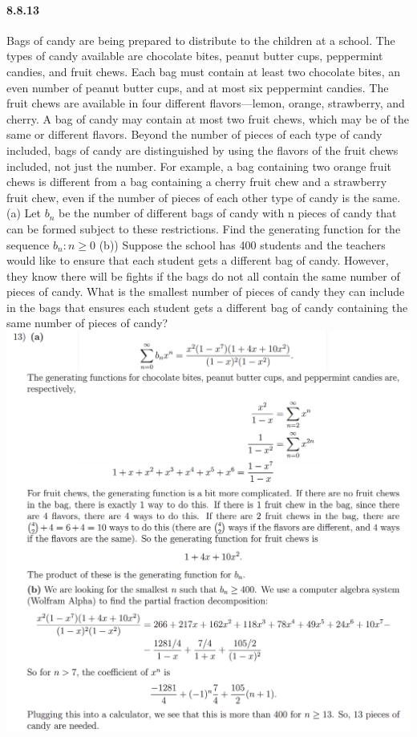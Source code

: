 \documentclass{article}
\begin{document}
\paragraph{8.8.13}
Bags of candy are being prepared to distribute to the children at a school. The
types of candy available are chocolate bites, peanut butter cups, peppermint candies,
and fruit chews. Each bag must contain at least two chocolate bites, an even number of peanut butter cups, and at most six peppermint candies. The fruit chews are available
in four different flavors—lemon, orange, strawberry, and cherry. A bag of candy may
contain at most two fruit chews, which may be of the same or different flavors. Beyond
the number of pieces of each type of candy included, bags of candy are distinguished
by using the flavors of the fruit chews included, not just the number. For example, a
bag containing two orange fruit chews is different from a bag containing a cherry fruit
chew and a strawberry fruit chew, even if the number of pieces of each other type of
candy is the same.\newline
(a) Let $b_n$ be the number of different bags of candy with n pieces of candy that can be
formed subject to these restrictions. Find the generating function for the sequence
${b_n : n \ge 0}$\newline
(b)) Suppose the school has 400 students and the teachers would like to ensure that
each student gets a different bag of candy. However, they know there will be
fights if the bags do not all contain the same number of pieces of candy. What is
the smallest number of pieces of candy they can include in the bags that ensures
each student gets a different bag of candy containing the same number of pieces
of candy?\newline
\includegraphics{0019}
\end{document}
